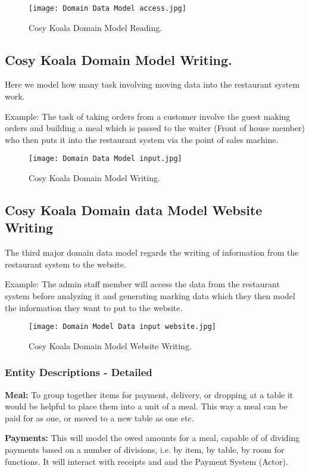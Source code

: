 \documentclass{article}
\begin{document}
\begin{figure}[!ht]
    \centering
    \texttt{[image: Domain Data Model access.jpg]}
    \caption{Cosy Koala Domain Model Reading.}
    \label{fig:Domain_Model_access}
\end{figure}

\clearpage
\subsection{Cosy Koala Domain Model Writing.}
Here we model how many task involving moving data into the restaurant system work.

Example: The task of taking orders from a customer involve the guest making orders and building a meal which is passed to the waiter (Front of house member) who then puts it into the restaurant system via the point of sales machine.
\begin{figure}[!ht]
    \centering
    \texttt{[image: Domain Data Model input.jpg]}
    \caption{Cosy Koala Domain Model Writing.}
    \label{fig:Domain_Model_input}
\end{figure}

\clearpage
\subsection{Cosy Koala Domain data Model Website Writing}
The third major domain data model regards the writing of information from the restaurant system to the website.

Example: The admin staff member will access the data from the restaurant system before analyzing it and generating marking data which they then model the information they want to put to the website.
\begin{figure}[!ht]
    \centering
    \texttt{[image: Domain Model Data input website.jpg]}
    \caption{Cosy Koala Domain Model Website Writing.}
    \label{fig:Domain_Model_website}
\end{figure}


\subsubsection{Entity Descriptions - Detailed}
\textbf{Meal:} To group together items for payment, delivery, or dropping at a table it would be helpful to place them into a unit of a meal. This way a meal can be paid for as one, or moved to a new table as one etc.

\textbf{Payments:} This will model the owed amounts for a meal, capable of of dividing payments based on a number of divisions, i.e. by item, by table, by room for functions. It will interact with receipts and and the Payment System (Actor).
\end{document}

